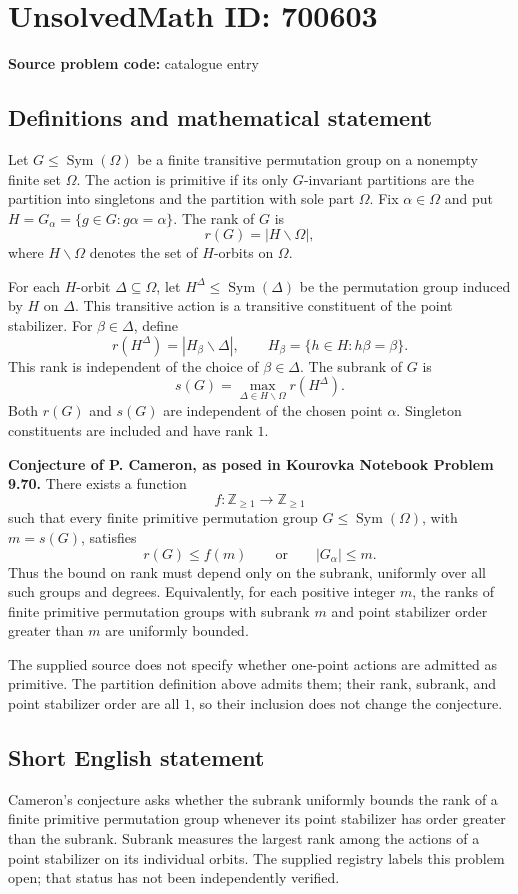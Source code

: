 \documentclass[11pt]{article}
\newcommand{\Z}{\mathbb{Z}}
\begin{document}
\section*{UnsolvedMath ID: 700603}
\textbf{Source problem code:} catalogue entry
\subsection{Definitions and mathematical statement}
Let \(G\leq\operatorname{Sym}(\Omega)\) be a finite transitive permutation group on a nonempty finite set \(\Omega\). The action is primitive if its only \(G\)-invariant partitions are the partition into singletons and the partition with sole part \(\Omega\). Fix \(\alpha\in\Omega\) and put \(H=G_\alpha=\{g\in G:g\alpha=\alpha\}\). The rank of \(G\) is
\[
 r(G)=|H\backslash\Omega|,
\]
where \(H\backslash\Omega\) denotes the set of \(H\)-orbits on \(\Omega\).

For each \(H\)-orbit \(\Delta\subseteq\Omega\), let \(H^\Delta\leq\operatorname{Sym}(\Delta)\) be the permutation group induced by \(H\) on \(\Delta\). This transitive action is a transitive constituent of the point stabilizer. For \(\beta\in\Delta\), define
\[
 r(H^\Delta)=|H_\beta\backslash\Delta|,
 \qquad H_\beta=\{h\in H:h\beta=\beta\}.
\]
This rank is independent of the choice of \(\beta\in\Delta\). The subrank of \(G\) is
\[
 s(G)=\max_{\Delta\in H\backslash\Omega}r(H^\Delta).
\]
Both \(r(G)\) and \(s(G)\) are independent of the chosen point \(\alpha\). Singleton constituents are included and have rank \(1\).

\textbf{Conjecture of P. Cameron, as posed in Kourovka Notebook Problem 9.70.} There exists a function
\[
 f:\Z_{\geq1}\longrightarrow\Z_{\geq1}
\]
such that every finite primitive permutation group \(G\leq\operatorname{Sym}(\Omega)\), with \(m=s(G)\), satisfies
\[
 r(G)\leq f(m)\qquad\text{or}\qquad |G_\alpha|\leq m.
\]
Thus the bound on rank must depend only on the subrank, uniformly over all such groups and degrees. Equivalently, for each positive integer \(m\), the ranks of finite primitive permutation groups with subrank \(m\) and point stabilizer order greater than \(m\) are uniformly bounded.

The supplied source does not specify whether one-point actions are admitted as primitive. The partition definition above admits them; their rank, subrank, and point stabilizer order are all \(1\), so their inclusion does not change the conjecture.
\subsection{Short English statement}
Cameron's conjecture asks whether the subrank uniformly bounds the rank of a finite primitive permutation group whenever its point stabilizer has order greater than the subrank. Subrank measures the largest rank among the actions of a point stabilizer on its individual orbits. The supplied registry labels this problem open; that status has not been independently verified.
\end{document}
